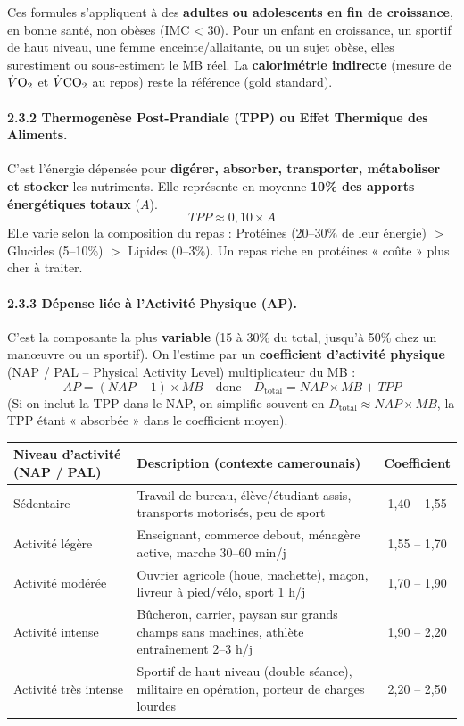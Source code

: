 \documentclass[11pt]{article}
\begin{document}
\begin{attention}
Ces formules s'appliquent à des \textbf{adultes ou adolescents en fin de croissance}, en bonne santé, non obèses (IMC < 30). Pour un enfant en croissance, un sportif de haut niveau, une femme enceinte/allaitante, ou un sujet obèse, elles surestiment ou sous-estiment le MB réel. La \textbf{calorimétrie indirecte} (mesure de $\dot{V}\ce{O2}$ et $\dot{V}\ce{CO2}$ au repos) reste la référence (gold standard).
\end{attention}

\paragraph{2.3.2 Thermogenèse Post-Prandiale (TPP) ou Effet Thermique des Aliments.}
C'est l'énergie dépensée pour \textbf{digérer, absorber, transporter, métaboliser et stocker} les nutriments. Elle représente en moyenne \textbf{10\% des apports énergétiques totaux} ($A$).
\[
TPP \approx 0,10 \times A
\]
Elle varie selon la composition du repas : Protéines (20--30\% de leur énergie) $>$ Glucides (5--10\%) $>$ Lipides (0--3\%). Un repas riche en protéines « coûte » plus cher à traiter.

\paragraph{2.3.3 Dépense liée à l'Activité Physique (AP).}
C'est la composante la plus \textbf{variable} (15 à 30\% du total, jusqu'à 50\% chez un manœuvre ou un sportif). On l'estime par un \textbf{coefficient d'activité physique} (NAP / PAL -- Physical Activity Level) multiplicateur du MB :
\[
AP = (NAP - 1) \times MB \quad \text{donc} \quad D_{\text{total}} = NAP \times MB + TPP
\]
(Si on inclut la TPP dans le NAP, on simplifie souvent en $D_{\text{total}} \approx NAP \times MB$, la TPP étant « absorbée » dans le coefficient moyen).

\begin{center}
\begin{tabularx}{\linewidth}{|l|X|c|}\hline
\rowcolor{popblueL}
\textbf{Niveau d'activité (NAP / PAL)} & \textbf{Description (contexte camerounais)} & \textbf{Coefficient} \\ \hline
Sédentaire & Travail de bureau, élève/étudiant assis, transports motorisés, peu de sport & 1,40 -- 1,55 \\ \hline
Activité légère & Enseignant, commerce debout, ménagère active, marche 30--60 min/j & 1,55 -- 1,70 \\ \hline
Activité modérée & Ouvrier agricole (houe, machette), maçon, livreur à pied/vélo, sport 1 h/j & 1,70 -- 1,90 \\ \hline
Activité intense & Bûcheron, carrier, paysan sur grands champs sans machines, athlète entraînement 2--3 h/j & 1,90 -- 2,20 \\ \hline
Activité très intense & Sportif de haut niveau (double séance), militaire en opération, porteur de charges lourdes & 2,20 -- 2,50 \\ \hline
\end{tabularx}
\end{center}
\end{document}
